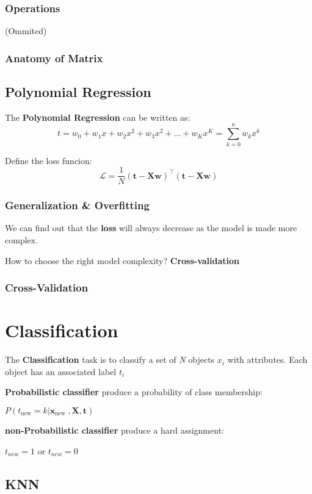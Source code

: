 \documentclass[12pt]{article}
\begin{document}
\subsubsection{Operations}
(Ommited)

\subsubsection{Anatomy of Matrix}

\subsection{Polynomial Regression}

The \textbf{Polynomial Regression} can be written as:
$$
t=w_{0}+w_{1} x+w_{2} x^{2}+w_{3} x^{2}+\ldots+w_{K} x^{K}=\sum_{k=0}^{\kappa} w_{k} x^{k}
$$

Define the loss funcion:
$$
\mathcal{L}=\frac{1}{N}(\mathbf{t}-\mathbf{X} \mathbf{w})^{\top}(\mathbf{t}-\mathbf{X} \mathbf{w})
$$
\subsubsection{Generalization \& Overfitting}

We can find out that the \textbf{loss} will always decrease
as the model is made more complex.

How to choose the right model complexity?
\textbf{Cross-validation}

\subsubsection{Cross-Validation}

\section{Classification}

The \textbf{Classification} task is to classify
a set of \textit{N} objects $x_i$ with attributes.
Each object has an associated label $t_i$

\textbf{Probabilistic classifier} produce a probability of class membership:

$P(t_{\text {new}}=k | \mathbf{x}_{\text {new }}, \mathbf{X}, \mathbf{t})$

\textbf{non-Probabilistic classifier} produce a hard assignment:

$t_{new}=1$ or $t_{new}=0$

\subsection{KNN}
\end{document}
